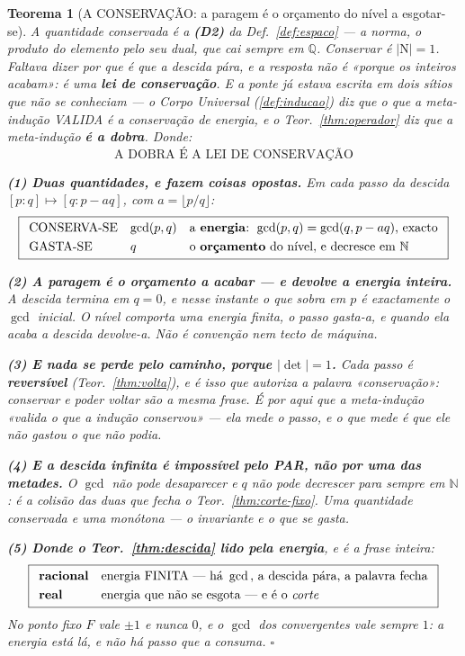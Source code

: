 \documentclass[11pt,a4paper]{article}
\newtheorem{teorema}{Teorema}
\newcommand{\abs}[1]{\lvert #1\rvert}
\begin{document}
\begin{teorema}[A CONSERVAÇÃO: a paragem é o orçamento do nível a esgotar-se]\label{thm:conservacao}
\emph{A quantidade conservada é a} \textbf{(D2)} \emph{da Def.~\ref{def:espaco}} --- a
norma, o produto do elemento pelo seu dual, que cai sempre em $\mathbb{Q}$. Conservar é
$\abs{\mathrm{N}}=1$.
Faltava dizer \emph{por que} é que a descida pára, e a resposta não é «porque os inteiros
acabam»: é uma \textbf{lei de conservação}. E a ponte já estava escrita em dois sítios que
não se conheciam --- o \emph{Corpo Universal} (\ref{def:inducao}) diz que \emph{o que
a meta-indução VALIDA é a conservação de energia}, e o Teor.~\ref{thm:operador} diz que a
meta-indução \textbf{é a dobra}. Donde:
\[
\boxed{\;\text{A DOBRA É A LEI DE CONSERVAÇÃO}\;}
\]

\textbf{(1) Duas quantidades, e fazem coisas opostas.} Em cada passo da descida
$[p{:}q]\mapsto[q:p-aq]$, com $a=\lfloor p/q\rfloor$:
\[
\boxed{
\begin{array}{lll}
\text{CONSERVA-SE} & \gcd(p,q) & \text{a \textbf{energia}: }\gcd(p,q)=\gcd(q,p-aq)\text{,
exacto}\\[3pt]
\text{GASTA-SE} & q & \text{o \textbf{orçamento} do nível, e decresce em }\mathbb{N}
\end{array}}
\]

\textbf{(2) A paragem é o orçamento a acabar --- e devolve a energia inteira.} A descida
termina em $q=0$, e nesse instante o que sobra em $p$ é \emph{exactamente} o
$\gcd$ inicial. \emph{O nível comporta uma energia finita, o passo gasta-a, e quando ela
acaba a descida devolve-a.} Não é convenção nem tecto de máquina.

\textbf{(3) E nada se perde pelo caminho, porque $\abs{\det}=1$.} Cada passo é
\textbf{reversível} (Teor.~\ref{thm:volta}), e é isso que autoriza a palavra
«conservação»: \emph{conservar e poder voltar são a mesma frase}. É por aqui que a
meta-indução «valida o que a indução conservou» --- ela mede o passo, e o que mede é que
ele não gastou o que não podia.

\textbf{(4) E a descida infinita é impossível pelo PAR, não por uma das metades.} O
$\gcd$ não pode desaparecer e $q$ não pode decrescer para sempre em $\mathbb{N}$: é a
colisão das duas que fecha o Teor.~\ref{thm:corte-fixo}. Uma quantidade conservada e uma
monótona --- \emph{o invariante e o que se gasta}.

\textbf{(5) Donde o Teor.~\ref{thm:descida} lido pela energia}, e é a frase inteira:
\[
\boxed{
\begin{array}{ll}
\text{\textbf{racional}} & \text{energia FINITA --- há }\gcd\text{, a descida pára, a
palavra fecha}\\[3pt]
\text{\textbf{real}} & \text{energia que não se esgota --- e é o \emph{corte}}
\end{array}}
\]
No ponto fixo $F$ vale $\pm1$ e nunca $0$, e o $\gcd$ dos convergentes vale sempre $1$:
\emph{a energia está lá, e não há passo que a consuma}. $\square$
\end{teorema}
\end{document}
